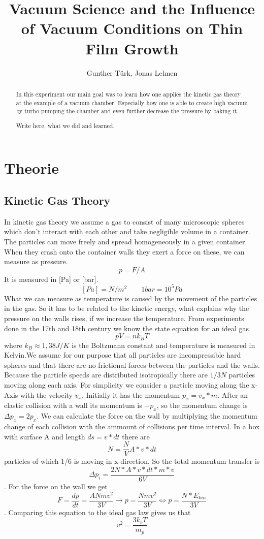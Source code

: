 \documentclass[]{article}
\title{Vacuum Science and the Inﬂuence of Vacuum Conditions on Thin Film Growth}
\author{Gunther T\"urk, Jonas Lehnen}
\begin{document}
\maketitle
\tableofcontents
\begin{abstract}
In this experiment our main goal was to learn how one applies the kinetic gas theory at the example of a vacuum chamber. Especially how one is able to create high vacuum by turbo pumping the chamber and even further decrease the pressure by baking it. 

Write here, what we did and learned.
\end{abstract}

\section{Theorie}
\subsection{Kinetic Gas Theory}
In kinetic gas theory we assume a gas to consist of many microscopic spheres which don't interact with each other and take negligible volume in a container. The particles can move freely and spread homogeneously in a given container. When they crash onto the container walls they exert a force on these, we can measure as pressure. 
\[ p=F/A \]
It is measured in [Pa] or [bar].
\[ [Pa]=N/m^{2}     \qquad  1bar=10^{5}Pa		 \]
What we can measure as temperature is caused by the movement of the particles in the gas. So it has to be related to the kinetic energy, what explains why the pressure on the walls rises, if we increase the temperature. From experiments done in the 17th and 18th century we know the state equation for an ideal gas
\[ pV=nk_{B} T\]
 where $k_{B}\approx1,38J/K$ is the Boltzmann constant and temperature is measured in Kelvin.We assume for our purpose that all particles are incompressible hard spheres and that there are no frictional forces between the particles and the walls. Because the particle speeds are distributed isotropically there are $1/3N$ particles moving along each axis. For simplicity we consider a particle moving along the x-Axis with the velocity $v_{x}$. Initially it has the momentum $p_{x}=v_{x}*m$. After an elastic collision with a wall its momentum is $-p_{x}$, so the momentum change is $\Delta p_{x}=2p_{x}$. We can calculate the force on the wall by multiplying the momentum change of each collision with the ammount of collisions per time interval. In a box with surface A and length $ds=v*dt$ there are \[ N=\frac{N}{V}A *v* dt \] particles of which 1/6 is moving in x-direction. So the total momentum transfer is \[ \Delta p_{i}=\frac{2N* A* v* dt*m* v}{6V} \]. For the force on the wall we get \[ F=\frac{dp}{dt}=\frac{ANmv^{2}}{3V} \rightarrow p=\frac{Nmv^{2}}{3V} \Leftrightarrow p=\frac{N*E_{kin}}{3V}\]. Comparing this equation to the ideal gas law gives us that \[ v^{2}=\frac{3k_{b}T}{m_{p}} \] 
\end{document}
